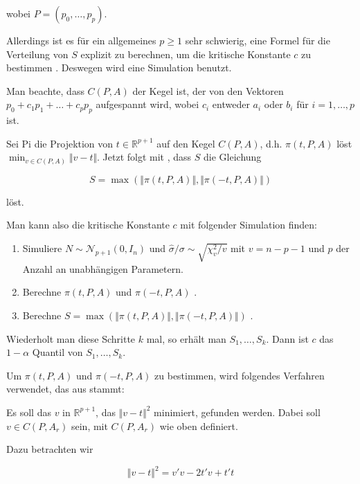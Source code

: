 \documentclass[12pt,a4paper]{article}
\theoremstyle{definition}
\theoremstyle{definition}
\theoremstyle{definition}
\theoremstyle{definition}
\begin{document}
wobei $P=(p_0, \ldots, p_p)$. 

Allerdings ist es für ein allgemeines $p \geq 1$ sehr schwierig, eine Formel für die Verteilung von $S$ explizit zu berechnen, um die kritische Konstante $c$ zu bestimmen \cite[S.70, Z.18]{Liu64}. Deswegen wird eine Simulation benutzt.

Man beachte, dass $C(P,A)$ der Kegel ist, der von den Vektoren $p_0+c_1 p_1 + \ldots + c_p p_p $ aufgespannt wird, wobei $c_i$ entweder $a_i$ oder $b_i$ für $i=1,\ldots,p$ ist. 

Sei \gls{Pi} die Projektion von $t \in \mathbb{R}^{p+1}$ auf den Kegel $C(P,A)$, d.h. $\pi(t,P,A)$ löst $ \min_{v \in C(P,A)} \Vert v-t \Vert$. Jetzt folgt mit \cite[Theorem 2.1]{Naiman87} , dass $S$ die Gleichung

\begin{equation*}
S=\max(\Vert \pi(t,P,A) \Vert, \Vert \pi(-t,P,A) \Vert)
\end{equation*}
 
löst. 

Man kann also die kritische Konstante $c$ mit folgender Simulation finden:

\begin{enumerate}
\item Simuliere $N \sim \mathscr{N}_{p+1}(0,I_{n})$ und $\hat{\sigma}/\sigma\sim\sqrt{\chi_v^2/v}$ mit $v=n-p-1$ und $p$ der Anzahl an unabhängigen Parametern.
\item Berechne $\pi(t,P,A)$ und $\pi(-t,P,A)$ .
\item Berechne $S=\max(\Vert \pi(t,P,A) \Vert, \Vert \pi(-t,P,A) \Vert)$ .
\end{enumerate}

Wiederholt man diese Schritte $k$ mal, so erhält man $S_1, \ldots, S_k$. Dann ist $c$ das $1-\alpha$ Quantil von $S_1, \ldots, S_k$.

Um $\pi(t,P,A)$ und $\pi(-t,P,A)$ zu bestimmen, wird folgendes Verfahren verwendet, das aus \cite[Appendix B]{Liu64} stammt:

Es soll das $v$ in $\mathbb{R}^{p+1}$, das $\Vert v-t \Vert^2$ minimiert, gefunden werden. Dabei soll $v \in C(P,A_{r})$ sein, mit $C(P,A_{r})$ wie oben definiert. 

Dazu betrachten wir

\begin{equation*}
\Vert v-t \Vert^2 = v'v-2t'v+t't 
\end{equation*}
\end{document}
